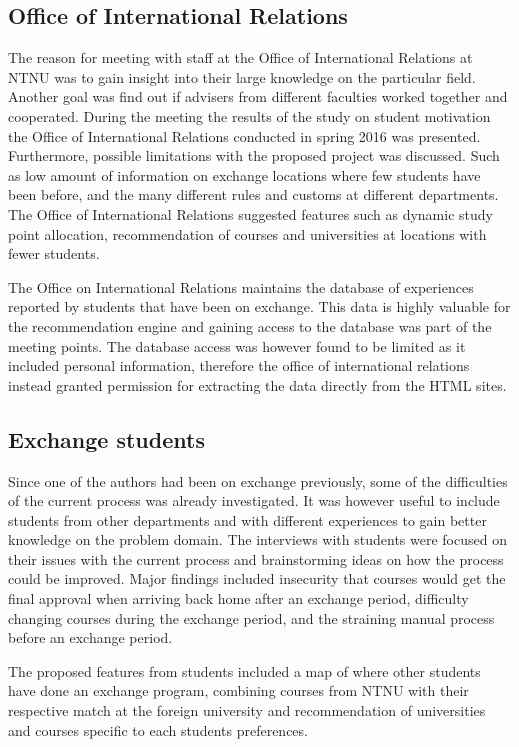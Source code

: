 \subsection{Office of International Relations}
The reason for meeting with staff at the Office of International Relations at NTNU was to gain insight into their large knowledge on the particular field. Another goal was find out if advisers from different faculties worked together and cooperated. During the meeting the results of the study on student motivation the Office of International Relations conducted in spring 2016 was presented. Furthermore, possible limitations with the proposed project was discussed. Such as low amount of information on exchange locations where few students have been before, and the many different rules and customs at different departments. The Office of International Relations suggested features such as dynamic study point allocation, recommendation of courses and universities at locations with fewer students.

The Office on International Relations maintains the database of experiences reported by students that have been on exchange. This data is highly valuable for the recommendation engine and gaining access to the database was part of the meeting points. The database access was however found to be limited as it included personal information, therefore the office of international relations instead granted permission for extracting the data directly from the HTML sites. 

\subsection{Exchange students}
Since one of the authors had been on exchange previously, some of the difficulties of the current process was already investigated. It was however useful to include students from other departments and with different experiences to gain better knowledge on the problem domain. The interviews with students were focused on their issues with the current process and brainstorming ideas on how the process could be improved. Major findings included insecurity that courses would get the final approval when arriving back home after an exchange period, difficulty changing courses during the exchange period, and the straining manual process before an exchange period.

The proposed features from students included a map of where other students have done an exchange program, combining courses from NTNU with their respective match at the foreign university and recommendation of universities and courses specific to each students preferences. 


